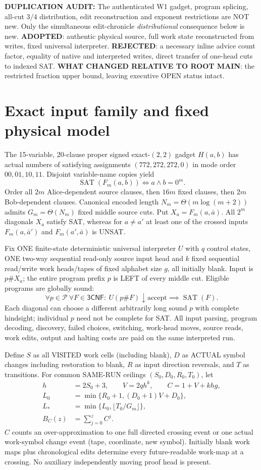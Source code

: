 \documentclass[11pt]{article}
\begin{document}
\textbf{DUPLICATION AUDIT:} The authenticated W1 gadget, program splicing, all-cut $3/4$ distribution, edit reconstruction and exponent restrictions are NOT new. Only the simultaneous edit-chronicle \emph{distributional} consequence below is new. \textbf{ADOPTED}: authentic physical source, full work state reconstructed from writes, fixed universal interpreter. \textbf{REJECTED}: a necessary inline advice count factor, equality of native and interpreted writes, direct transfer of one-head cuts to indexed SAT. \textbf{WHAT CHANGED RELATIVE TO ROOT MAIN}: the restricted fraction upper bound, leaving executive OPEN status intact.

\section{Exact input family and fixed physical model}
The 15-variable, 20-clause proper signed exact-$(2,2)$ gadget $H(a,b)$ has actual numbers of satisfying assignments $(772,272,272,0)$ in mode order $00,01,10,11$. Disjoint variable-name copies yield
\[
 \operatorname{SAT}(F_m(a,b))\iff a\wedge b=0^m.
\]
Order all $2m$ Alice-dependent source clauses, then $16m$ fixed clauses, then $2m$ Bob-dependent clauses. Canonical encoded length $N_m=\Theta(m\log(m+2))$ admits $G_m=\Theta(N_m)$ fixed middle source cuts. Put $X_a=F_m(a,\bar a)$. All $2^m$ diagonals $X_a$ satisfy SAT, whereas for $a\ne a'$ at least one of the crossed inputs $F_m(a,\bar a')$ and $F_m(a',\bar a)$ is UNSAT.

Fix ONE finite-state deterministic universal interpreter $U$ with $q$ control states, ONE two-way sequential read-only source input head and $k$ fixed sequential read/write work heads/tapes of fixed alphabet size $g$, all initially blank. Input is $p\#X_a$; the entire program prefix $p$ is LEFT of every middle cut. Eligible programs are globally sound:
\[
 \forall p\in\mathcal P\ \forall F\in\mathsf{3CNF}:\ 
 U(p\#F)\downarrow\mathrm{accept}\implies\operatorname{SAT}(F).
\]
Each diagonal can choose a different arbitrarily long sound $p$ with complete hindsight; individual $p$ need not be complete for SAT. All input parsing, program decoding, discovery, failed choices, switching, work-head moves, source reads, work edits, output and halting costs are paid on the same interpreted run.

Define $S$ as all VISITED work cells (including blank), $D$ as ACTUAL symbol changes including restoration to blank, $R$ as input direction reversals, and $T$ as transitions. For common SAME-RUN ceilings $(S_0,D_0,R_0,T_0)$, let
\[
 \begin{split}
 h&=2S_0+3,\qquad V=2q h^k,\qquad C=1+V+khg,\\
 L_0&=\min\{R_0+1,(D_0+1)V+D_0\},\\
 L_*&=\min\{L_0,\lfloor T_0/G_m\rfloor\},\\
 B_C(z)&=\sum_{j=0}^{z}C^j.
 \end{split}
\]
$C$ counts an over-approximation to one full directed crossing event or one actual work-symbol change event (tape, coordinate, new symbol). Initially blank work maps plus chronological edits determine every future-readable work-map at a crossing. No auxiliary independently moving proof head is present.
\end{document}

